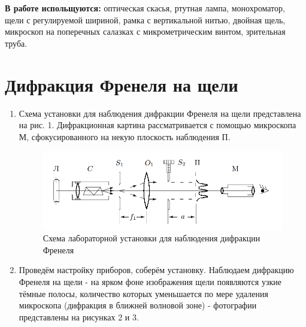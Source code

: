 \documentclass[a4paper]{article}
\begin{document}
\textbf{В работе испольщуются:} оптическая скасья, ртутная лампа, монохроматор, щели с регулируемой шириной, рамка с вертикальной нитью, двойная щель, микроскоп на поперечных салазках с микрометрическим винтом, зрительная труба.

\section{Дифракция Френеля на щели}
\begin{enumerate}
    \item Схема установки для наблюдения дифракции Френеля на щели представлена на рис. 1. Дифракционная картина рассматривается с помощью микроскопа М, сфокусированного на некую плоскость наблюдения П. 
\begin{figure}[h]
    \centering
    \includegraphics[width=15cm]{setup_frenel.PNG}
    \caption{Схема лабораторной установки для наблюдения дифракции Френеля}
    \label{fig:vac}
\end{figure}

\item Проведём настройку приборов, соберём установку. Наблюдаем дифракцию Френеля на щели - на ярком фоне изображения щели появляются узкие тёмные полосы, количество которых уменьшается по мере удаления микроскопа (дифракция в ближней волновой зоне) - фотографии представлены на рисунках 2 и 3.


\end{enumerate}
\end{document}
